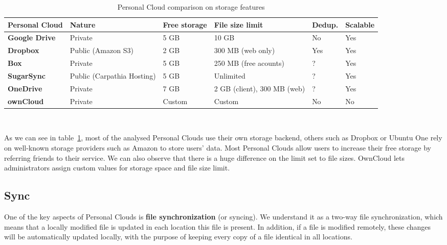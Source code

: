 \begin{table}
\begin{center}
    \begin{tabular}{ | p{3cm} | p{1.8cm} | p{1.5cm} | p{2.6cm} | p{1.3cm} | p{1.5cm} | }
    \hline
    \rowcolor[gray]{0.8}

	\textbf{Personal Cloud} &
\textbf{Nature} &
\textbf{Free storage} &
\textbf{File size limit} & 
\textbf{Dedup.} & 
\textbf{Scalable} \\ \hline

	\textbf{Google Drive} &
	Private &
	5 GB &
	10 GB &
	No &
	Yes \\ \hline

	\textbf{Dropbox} &
	Public (Amazon S3) &
	2 GB &
	300 MB (web only) &
	Yes &
	Yes \\ \hline
	
	
	\textbf{Box} &
	Private &
	5 GB & 
	250 MB (free acounts) &
	? &
	Yes \\ \hline
	
	\textbf{SugarSync} & 
	Public (Carpathia Hosting) &
	5 GB &
	Unlimited &
	? &
	Yes \\ \hline
	
	\textbf{OneDrive} & 
	Private &
	7 GB &
	2 GB (client), 300 MB (web) &
	? &
	Yes \\ \hline
	
	\textbf{ownCloud} &
	Private &
	Custom &
	Custom &
	No &
	No \\ \hline

    \end{tabular}
    \\[10pt]
    \caption{Personal Cloud comparison on storage features}
    \label{tab:pc_storage}
\end{center}
\end{table}

As we can see in table~\ref{tab:pc_storage}, most of the analysed Personal Clouds use their own storage backend, others such as Dropbox or Ubuntu One rely on well-known storage providers such as Amazon to store users' data. Most Personal Clouds allow users to increase their free storage by referring friends to their service. We can also observe that there is a huge difference on the limit set to file sizes. OwnCloud lets administrators assign custom values for storage space and file size limit.

\subsection{Sync}
One of the key aspects of Personal Clouds is \textbf{file synchronization} (or syncing). We understand it as a two-way file synchronization, which means that a locally modified file is updated in each location this file is present. In addition, if a file is modified remotely, these changes will be automatically updated locally, with the purpose of keeping every copy of a file identical in all locations.

